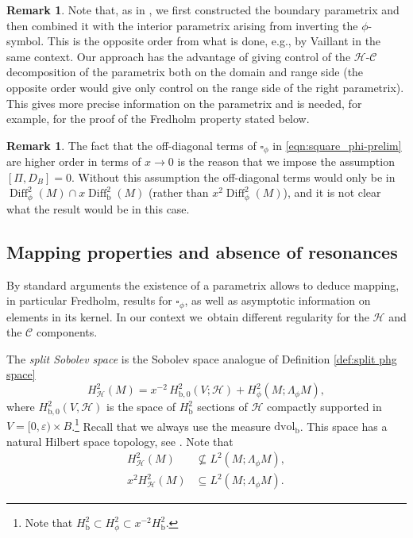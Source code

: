 \documentclass[JEP,XML,SOM,Unicode,NoFloatCountersInSection,published]{cedram}
\theoremstyle{plain}
\theoremstyle{definition}
\newtheorem{Rem}[Th]{Remark}
\newcommand{\bb}{{\mathrm{b}}}
\newcommand{\dvol}{\mathrm{dvol}}
\DeclareMathOperator{\Diff}{Diff}
\newcommand{\Hsplit}{H_{\mathscr{H}}}
\begin{document}
\begin{Rem}
Note that, as in \cite{grieser-para}, we first constructed the boundary parametrix and then combined it with the interior parametrix arising from inverting the $\phi$-symbol. This is the opposite order from what is done, e.g., by
Vaillant \cite{vaillant} in the same context. Our approach has the advantage of giving control of the $\mathscr{H}$-$\mathscr{C}$ decomposition of the parametrix both on the domain and range side (the opposite order would give only control on the range side of the right parametrix). This gives more precise information on the parametrix and is needed, for example, for the proof of the Fredholm property stated below.
\end{Rem}
\begin{Rem}\label{Dpi-condition}
The fact that the off-diagonal terms of $\square_\phi$ in \eqref{eqn:square_phi-prelim} are higher order in terms of $x\to0$ is the reason that we impose the assumption $[\Pi,D_B]=0$. Without this assumption the off-diagonal terms would only be in $\Diff^2_\phi(M)\cap x\Diff^2_\bb(M)$ (rather than $x^2\Diff^2_\phi(M)$), and it is not clear what the result would be in this case.
\end{Rem}

\subsection{Mapping properties and absence of resonances}
By standard arguments the existence of a parametrix allows to deduce mapping, in particular Fredholm, results for $\square_\phi$, as well as asymptotic information on elements in its kernel. In our context we~obtain different regularity for the $\mathscr{H}$ and the $\mathscr{C}$ components.

The \emph{split Sobolev space} is the Sobolev space analogue of Definition \ref{def:split phg space}
\begin{equation}
\label{eqn:def Hsplit}
\Hsplit^2(M) = x^{-2}\,H^2_{\bb,0}(V;\mathscr{H}) + H^2_\phi(M; \Lambda_\phi M),
\end{equation}
where $H^2_{\bb,0}(V,\mathscr{H})$ is the space of $H^2_\bb$ sections of
$\mathscr{H}$ compactly supported in $V=[0,\varepsilon) \times B$.\footnote{Note that $H^2_\bb\subset H^2_\phi\subset x^{-2}H^2_\bb$.}
Recall that we always use the measure $\dvol_\bb$.
This space has a natural Hilbert space topology, see
\cite[\S 6.1, Def.\,7]{grieser-para}. Note that
\begin{equation}\label{H-split-inclusions}
\begin{split}
H^2_{\mathscr{H}}(M) &\not\subseteq
L^2(M; \Lambda_\phi M), \\
x^2H^2_{\mathscr{H}}(M) &\subseteq
L^2(M; \Lambda_\phi M).
\end{split}
\end{equation}
\end{document}
